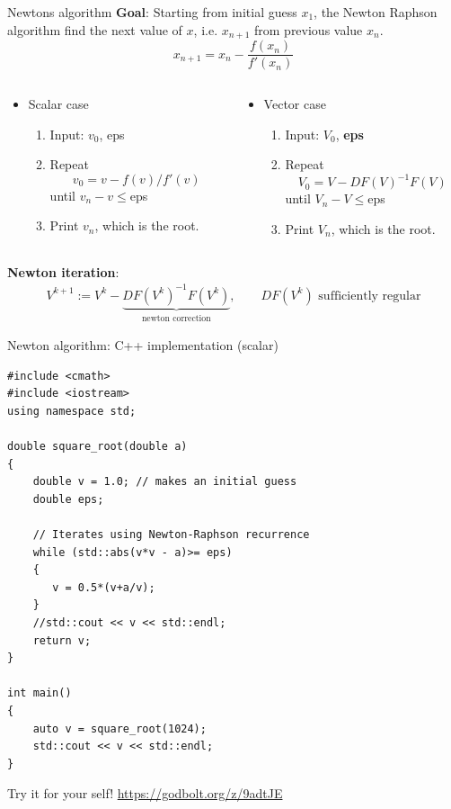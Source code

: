 \documentclass[xcolor=dvipsnames]{beamer}
\begin{document}
\begin{frame}{Newtons algorithm}
\textbf{Goal}: Starting from initial guess $x_1$, the Newton Raphson algorithm find the next value of $x$, i.e. $x_{n+1}$ from
previous value $x_n$.
\[x_{n+1}=x_n - \frac{f(x_n)}{f'(x_n)}\]
\begin{columns}
	\begin{column}{.55\textwidth}
		\begin{itemize}
		\item Scalar case
			\begin{enumerate}
				\item Input: $v_0$, eps
				\item Repeat
				\[v_0 = v - f(v)/f'(v)\]
				until $v_n-v\le$eps
				\item Print $v_n$, which is the root.
			\end{enumerate}
		\end{itemize}
	\end{column}
	\begin{column}{.75\textwidth}
 		\begin{itemize}
		\item Vector case
			\begin{enumerate}
				\item Input: $V_0$, \textbf{eps}
				\item Repeat
				\[V_0 = V - DF(V)^{-1} F(V)\]
				until $V_n-V\le$eps
				\item Print $V_n$, which is the root.
			\end{enumerate}
		\end{itemize}
    \end{column}
\end{columns}
\textbf{Newton iteration}:
\begin{align*}
 	V^{k+1}:= V^k - \underbrace{DF(V^k)^{-1}F(V^k)}_{\text{newton correction}},\qquad DF(V^k)\,\,\text{sufficiently regular}
 \end{align*} 

\end{frame}

\begin{frame}[fragile, shrink=10]{Newton algorithm: C++ implementation (scalar)}
\begin{verbatim}
#include <cmath>
#include <iostream>
using namespace std;

double square_root(double a)
{
    double v = 1.0; // makes an initial guess
    double eps;

    // Iterates using Newton-Raphson recurrence
    while (std::abs(v*v - a)>= eps)
    {
       v = 0.5*(v+a/v);
    }
    //std::cout << v << std::endl;
    return v;
}

int main()
{
    auto v = square_root(1024);
    std::cout << v << std::endl;
}
\end{verbatim}
Try it for your self!  \url{https://godbolt.org/z/9adtJE}
\end{frame}
\end{document}
